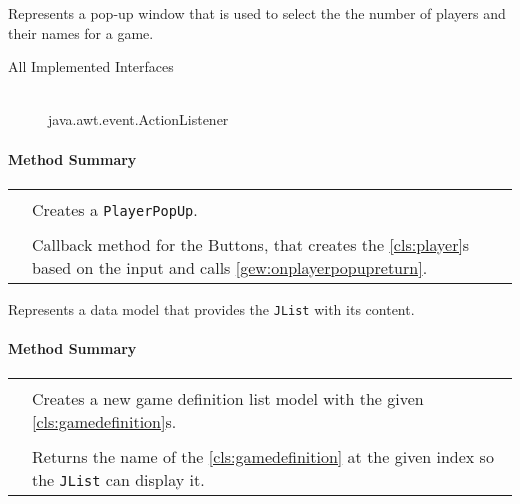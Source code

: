 \pagebreak


Represents a pop-up window that is used to select the the number of players and their names for a game. \\
\begin{description}
	\item[All Implemented Interfaces] \hfill \\
	java.awt.event.ActionListener
\end{description}

\centerdash

\paragraph*{Method Summary}
\paragraph*{}
\begin{longtable}{Lp{10cm}}
	\startmethodtable
	 \\
	& Creates a \texttt{PlayerPopUp}. \\
	 \\
	& Callback method for the Buttons, that creates the \ref{cls:player}s based on the input and calls \ref{gew:onplayerpopupreturn}. \\
	\hline
\end{longtable}

\pagebreak

Represents a data model that provides the \texttt{JList} with its content. \\

\centerdash

\paragraph*{Method Summary}
\paragraph*{}
\begin{longtable}{Lp{10cm}}
	\startmethodtable
	 \\
	& Creates a new game definition list model with the given \ref{cls:gamedefinition}s. \\
	 \\
	& Returns the name of the \ref{cls:gamedefinition} at the given index so the \texttt{JList} can display it. \\
	\hline
\end{longtable}

